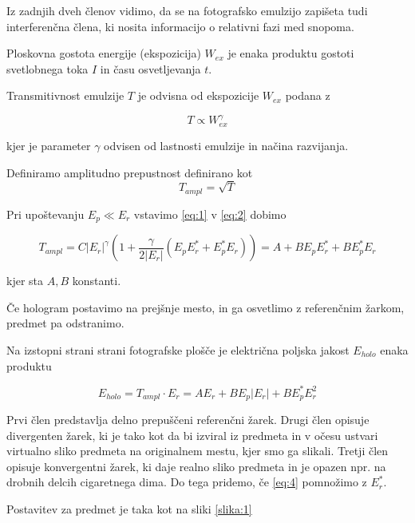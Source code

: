 \documentclass[11pt]{article}
\renewcommand{%
  \refname}{Viri}
\begin{document}
Iz zadnjih dveh členov vidimo, da se na fotografsko emulzijo zapišeta tudi interferenčna člena, ki nosita informacijo o relativni fazi med snopoma.

Ploskovna gostota energije (ekspozicija) \(W_{ex}\) je enaka produktu gostoti svetlobnega toka \(I\) in času osvetljevanja \(t\).

Transmitivnost emulzije \(T\) je odvisna od ekspozicije \(W_{ex}\) podana z

\[ T \propto W_{ex}^{\gamma}
\]

kjer je parameter \(\gamma\) odvisen od lastnosti emulzije in načina razvijanja.

Definiramo amplitudno prepustnost definirano kot
\begin{equation}\label{eq:2}
T_{ampl} = \sqrt{T}
\end{equation}

Pri upoštevanju \(E_p \ll E_r\) vstavimo \ref{eq:1} v \ref{eq:2} dobimo

\begin{equation}\label{eq:3}
T_{ampl} = C \left| E_r \right| ^{\gamma} \left( 1 + \frac{\gamma}{2 \left| E_r \right|} (E_p E^{*}_r + E_p^{*}E_r) \right) = A + BE_p E^{*}_r + BE_p^{*}E_r
\end{equation}

kjer sta \(A, B\) konstanti.

Če hologram postavimo na prejšnje mesto, in ga osvetlimo z referenčnim žarkom, predmet pa odstranimo.

Na izstopni strani strani fotografske plošče je električna poljska jakost \(E_{holo}\) enaka produktu

\begin{equation}\label{eq:4}
E_{holo} = T_{ampl} \cdot E_r =  AE_r + BE_p \left| E_r \right| + BE_p^{*}E_r^2
\end{equation}

Prvi člen predstavlja delno prepuščeni referenčni žarek. Drugi člen opisuje divergenten žarek, ki je tako kot da bi izviral iz predmeta in v očesu ustvari virtualno sliko predmeta na originalnem mestu, kjer smo ga slikali.
Tretji člen opisuje konvergentni žarek, ki daje realno sliko predmeta in je opazen npr. na drobnih delcih cigaretnega dima. Do tega pridemo, če \ref{eq:4} pomnožimo z \(E_r^{*}\).

Postavitev za predmet je taka kot na sliki \ref{slika:1}
\end{document}
